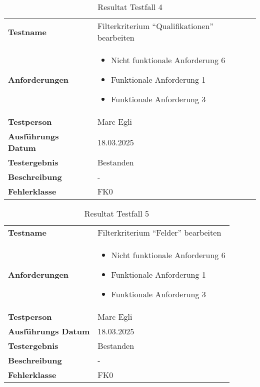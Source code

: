 \begin{table}[H]
    \begin{tabular}{|L{0.3\textwidth}|L{0.65\textwidth}|}
        \hline
           \\[10pt]
        \hline
        \textbf{Testname} & Filterkriterium ``Qualifikationen'' bearbeiten \\
        \hline
        \textbf{Anforderungen} & 
        \begin{itemize}
            \item Nicht funktionale Anforderung 6
            \item Funktionale Anforderung 1
            \item Funktionale Anforderung 3
        \end{itemize} \\
        \hline
        \textbf{Testperson} & Marc Egli \\
        \hline
        \textbf{Ausführungs Datum} & 18.03.2025 \\
        \hline
        \textbf{Testergebnis} & Bestanden \\
        \hline
        \textbf{Beschreibung} & - \\ 
        \hline
        \textbf{Fehlerklasse} & FK0 \\ 
        \hline
    \end{tabular}
    \caption{Resultat Testfall 4}
\end{table}

\begin{table}[H]
    \begin{tabular}{|L{0.3\textwidth}|L{0.65\textwidth}|}
        \hline
           \\[10pt]
        \hline
        \textbf{Testname} & Filterkriterium ``Felder'' bearbeiten \\
        \hline
        \textbf{Anforderungen} & 
        \begin{itemize}
            \item Nicht funktionale Anforderung 6
            \item Funktionale Anforderung 1
            \item Funktionale Anforderung 3
        \end{itemize} \\
        \hline
        \textbf{Testperson} & Marc Egli \\
        \hline
        \textbf{Ausführungs Datum} & 18.03.2025 \\
        \hline
        \textbf{Testergebnis} & Bestanden \\
        \hline
        \textbf{Beschreibung} & - \\ 
        \hline
        \textbf{Fehlerklasse} & FK0 \\ 
        \hline
    \end{tabular}
    \caption{Resultat Testfall 5}
\end{table}

